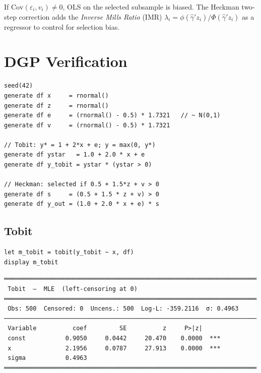 If $\mathrm{Cov}(\varepsilon_i, v_i) \neq 0$, OLS on the selected subsample
is biased. The Heckman two-step correction adds the
\emph{Inverse Mills Ratio} (IMR) $\lambda_i = \phi(\hat\gamma'z_i)/\Phi(\hat\gamma'z_i)$
as a regressor to control for selection bias.

\section{DGP Verification}

\begin{lstlisting}[caption={Tobit and Heckman DGP}]
seed(42)
generate df x     = rnormal()
generate df z     = rnormal()
generate df e     = (rnormal() - 0.5) * 1.7321   // ~ N(0,1)
generate df v     = (rnormal() - 0.5) * 1.7321

// Tobit: y* = 1 + 2*x + e; y = max(0, y*)
generate df ystar   = 1.0 + 2.0 * x + e
generate df y_tobit = ystar * (ystar > 0)

// Heckman: selected if 0.5 + 1.5*z + v > 0
generate df s     = (0.5 + 1.5 * z + v) > 0
generate df y_out = (1.0 + 2.0 * x + e) * s
\end{lstlisting}

\subsection*{Tobit}

\begin{lstlisting}
let m_tobit = tobit(y_tobit ~ x, df)
display m_tobit
\end{lstlisting}

\begin{lstlisting}[language={}, basicstyle=\ttfamily\small,
  frame=none, numbers=none, backgroundcolor=\color{codbg},
  xleftmargin=0pt, xrightmargin=0pt, breaklines=false]
══════════════════════════════════════════════════════════════════════
 Tobit  —  MLE  (left-censoring at 0)
══════════════════════════════════════════════════════════════════════
 Obs: 500  Censored: 0  Uncens.: 500  Log-L: -359.2116  σ: 0.4963
──────────────────────────────────────────────────────────────────────
 Variable          coef         SE          z     P>|z|
 const           0.9050     0.0442     20.470    0.0000  ***
 x               2.1956     0.0787     27.913    0.0000  ***
 sigma           0.4963
══════════════════════════════════════════════════════════════════════
\end{lstlisting}

